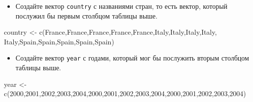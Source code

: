 \documentclass[
]{article}
\newenvironment{Shaded}{\begin{snugshade}}{\end{snugshade}}
\newcommand{\FunctionTok}[1]{\textcolor[rgb]{0.00,0.00,0.00}{#1}}
\newcommand{\NormalTok}[1]{#1}
\newcommand{\OtherTok}[1]{\textcolor[rgb]{0.56,0.35,0.01}{#1}}
\newcommand{\StringTok}[1]{\textcolor[rgb]{0.31,0.60,0.02}{#1}}
\providecommand{\tightlist}{%
  \setlength{\itemsep}{0pt}\setlength{\parskip}{0pt}}
\begin{document}
\begin{itemize}
\tightlist
\item
  Создайте вектор \texttt{country} с названиями стран, то есть вектор,
  который послужил бы первым столбцом таблицы выше.
\end{itemize}

\begin{Shaded}
\begin{Highlighting}[]
\NormalTok{country }\OtherTok{\textless{}{-}} \FunctionTok{c}\NormalTok{(}\StringTok{\textquotesingle{}France\textquotesingle{}}\NormalTok{,}\StringTok{\textquotesingle{}France\textquotesingle{}}\NormalTok{,}\StringTok{\textquotesingle{}France\textquotesingle{}}\NormalTok{,}\StringTok{\textquotesingle{}France\textquotesingle{}}\NormalTok{,}\StringTok{\textquotesingle{}France\textquotesingle{}}\NormalTok{,}\StringTok{\textquotesingle{}Italy\textquotesingle{}}\NormalTok{,}\StringTok{\textquotesingle{}Italy\textquotesingle{}}\NormalTok{,}\StringTok{\textquotesingle{}Italy\textquotesingle{}}\NormalTok{,}\StringTok{\textquotesingle{}Italy\textquotesingle{}}\NormalTok{,}
             \StringTok{\textquotesingle{}Italy\textquotesingle{}}\NormalTok{,}\StringTok{\textquotesingle{}Spain\textquotesingle{}}\NormalTok{,}\StringTok{\textquotesingle{}Spain\textquotesingle{}}\NormalTok{,}\StringTok{\textquotesingle{}Spain\textquotesingle{}}\NormalTok{,}\StringTok{\textquotesingle{}Spain\textquotesingle{}}\NormalTok{,}\StringTok{\textquotesingle{}Spain\textquotesingle{}}\NormalTok{)}
\end{Highlighting}
\end{Shaded}

\begin{itemize}
\tightlist
\item
  Создайте вектор \texttt{year} с годами, который мог бы послужить
  вторым столбцом таблицы выше.
\end{itemize}

\begin{Shaded}
\begin{Highlighting}[]
\NormalTok{year }\OtherTok{\textless{}{-}} \FunctionTok{c}\NormalTok{(}\StringTok{\textquotesingle{}2000\textquotesingle{}}\NormalTok{,}\StringTok{\textquotesingle{}2001\textquotesingle{}}\NormalTok{,}\StringTok{\textquotesingle{}2002\textquotesingle{}}\NormalTok{,}\StringTok{\textquotesingle{}2003\textquotesingle{}}\NormalTok{,}\StringTok{\textquotesingle{}2004\textquotesingle{}}\NormalTok{,}\StringTok{\textquotesingle{}2000\textquotesingle{}}\NormalTok{,}\StringTok{\textquotesingle{}2001\textquotesingle{}}\NormalTok{,}\StringTok{\textquotesingle{}2002\textquotesingle{}}\NormalTok{,}\StringTok{\textquotesingle{}2003\textquotesingle{}}\NormalTok{,}\StringTok{\textquotesingle{}2004\textquotesingle{}}\NormalTok{,}\StringTok{\textquotesingle{}2000\textquotesingle{}}\NormalTok{,}\StringTok{\textquotesingle{}2001\textquotesingle{}}\NormalTok{,}\StringTok{\textquotesingle{}2002\textquotesingle{}}\NormalTok{,}\StringTok{\textquotesingle{}2003\textquotesingle{}}\NormalTok{,}\StringTok{\textquotesingle{}2004\textquotesingle{}}\NormalTok{)}
\end{Highlighting}
\end{Shaded}
\end{document}
